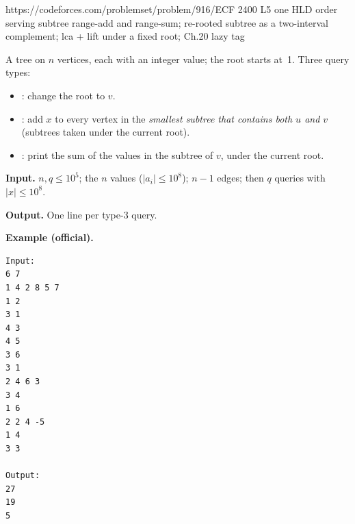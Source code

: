   {https://codeforces.com/problemset/problem/916/E}{CF 2400 L5}
  {one HLD order serving subtree range-add and range-sum; re-rooted subtree as a two-interval complement; lca + lift under a fixed root; Ch.20 lazy tag}

\begin{problemstatement}
A tree on \(n\) vertices, each with an integer value; the root starts at~1. Three query types:
\begin{itemize}[nosep]
  \item {}: change the root to \(v\).
  \item {}: add \(x\) to every vertex in the \emph{smallest subtree that contains both \(u\) and \(v\)} (subtrees taken under the current root).
  \item {}: print the sum of the values in the subtree of \(v\), under the current root.
\end{itemize}

\textbf{Input.} \(n,q\le 10^5\); the \(n\) values (\(|a_i|\le 10^8\)); \(n-1\) edges; then \(q\) queries with \(|x|\le 10^8\).

\textbf{Output.} One line per type-3 query.

\textbf{Example (official).}
\begin{verbatim}
Input:
6 7
1 4 2 8 5 7
1 2
3 1
4 3
4 5
3 6
3 1
2 4 6 3
3 4
1 6
2 2 4 -5
1 4
3 3

Output:
27
19
5
\end{verbatim}
\end{problemstatement}

